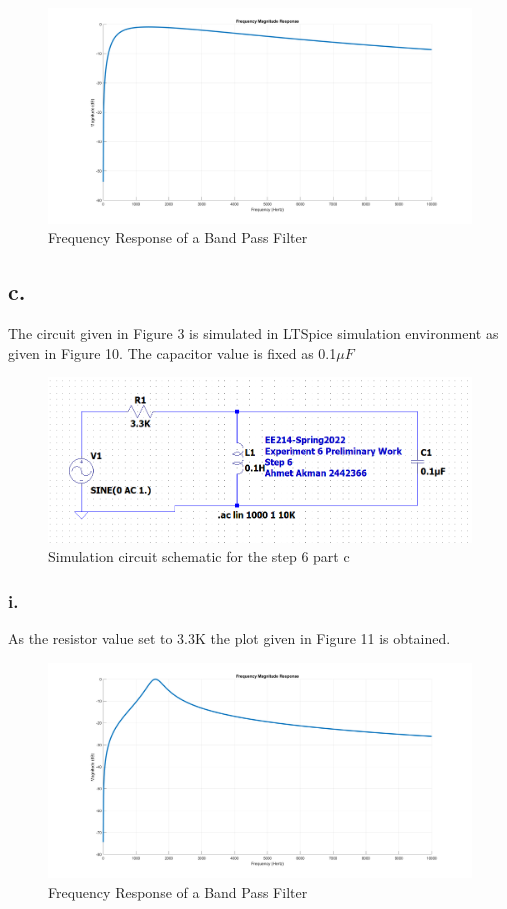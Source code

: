 \documentclass[letterpaper,12pt]{article}
\begin{document}
\begin{figure}[H]
    \centering
    \includegraphics[width=1\textwidth]{6_2_2.png}
    \caption{Frequency Response of a Band Pass Filter}
\end{figure} 

\subsection{c.}
The  circuit given in Figure 3 is simulated in LTSpice simulation environment as given in Figure 10. The capacitor value is fixed as 0.1\(\mu F\)
\begin{figure}[H]
    \centering
    \includegraphics[width=1\textwidth]{6cSim.png}
    \caption{Simulation circuit schematic for the step 6 part c}
\end{figure} 

\subsubsection{i.}
As the resistor value set to 3.3K the plot given in Figure 11 is obtained.
\begin{figure}[H]
    \centering
    \includegraphics[width=1\textwidth]{6_3_1.png}
    \caption{Frequency Response of a Band Pass Filter}
\end{figure} 
\end{document}
